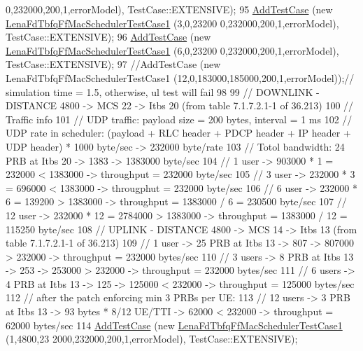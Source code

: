 \begin{DoxyCode}
      0,232000,200,1,errorModel), TestCase::EXTENSIVE);
95   \hyperlink{classns3_1_1TestCase_a3718088e3eefd5d6454569d2e0ddd835}{AddTestCase} (\textcolor{keyword}{new} \hyperlink{classLenaFdTbfqFfMacSchedulerTestCase1}{LenaFdTbfqFfMacSchedulerTestCase1} (3,0,23200
      0,232000,200,1,errorModel), TestCase::EXTENSIVE);
96   \hyperlink{classns3_1_1TestCase_a3718088e3eefd5d6454569d2e0ddd835}{AddTestCase} (\textcolor{keyword}{new} \hyperlink{classLenaFdTbfqFfMacSchedulerTestCase1}{LenaFdTbfqFfMacSchedulerTestCase1} (6,0,23200
      0,232000,200,1,errorModel), TestCase::EXTENSIVE);
97   \textcolor{comment}{//AddTestCase (new LenaFdTbfqFfMacSchedulerTestCase1 (12,0,183000,185000,200,1,errorModel));// simulation
       time = 1.5, otherwise, ul test will fail}
98 
99   \textcolor{comment}{// DOWNLINK - DISTANCE 4800 -> MCS 22 -> Itbs 20 (from table 7.1.7.2.1-1 of 36.213)}
100   \textcolor{comment}{// Traffic info}
101   \textcolor{comment}{//   UDP traffic: payload size = 200 bytes, interval = 1 ms}
102   \textcolor{comment}{//   UDP rate in scheduler: (payload + RLC header + PDCP header + IP header + UDP header) * 1000 byte/sec
       -> 232000 byte/rate }
103   \textcolor{comment}{// Totol bandwidth: 24 PRB at Itbs 20 -> 1383 -> 1383000 byte/sec}
104   \textcolor{comment}{// 1 user -> 903000 * 1 = 232000 < 1383000 -> throughput = 232000 byte/sec}
105   \textcolor{comment}{// 3 user -> 232000 * 3 = 696000 < 1383000 -> througphut = 232000 byte/sec}
106   \textcolor{comment}{// 6 user -> 232000 * 6 = 139200 > 1383000 -> throughput = 1383000 / 6 = 230500 byte/sec}
107   \textcolor{comment}{// 12 user -> 232000 * 12 = 2784000 > 1383000 -> throughput =  1383000 / 12 = 115250 byte/sec}
108   \textcolor{comment}{// UPLINK - DISTANCE 4800 -> MCS 14 -> Itbs 13 (from table 7.1.7.2.1-1 of 36.213)}
109   \textcolor{comment}{// 1 user -> 25 PRB at Itbs 13 -> 807 -> 807000 > 232000 -> throughput = 232000 bytes/sec}
110   \textcolor{comment}{// 3 users -> 8 PRB at Itbs 13 -> 253 -> 253000 > 232000 -> throughput = 232000 bytes/sec}
111   \textcolor{comment}{// 6 users -> 4 PRB at Itbs 13 -> 125 -> 125000 < 232000 -> throughput = 125000 bytes/sec}
112   \textcolor{comment}{// after the patch enforcing min 3 PRBs per UE:}
113   \textcolor{comment}{// 12 users -> 3 PRB at Itbs 13 -> 93  bytes * 8/12 UE/TTI  -> 62000 < 232000 -> throughput = 62000 
       bytes/sec}
114   \hyperlink{classns3_1_1TestCase_a3718088e3eefd5d6454569d2e0ddd835}{AddTestCase} (\textcolor{keyword}{new} \hyperlink{classLenaFdTbfqFfMacSchedulerTestCase1}{LenaFdTbfqFfMacSchedulerTestCase1} (1,4800,23
      2000,232000,200,1,errorModel), TestCase::EXTENSIVE);

\end{DoxyCode}
